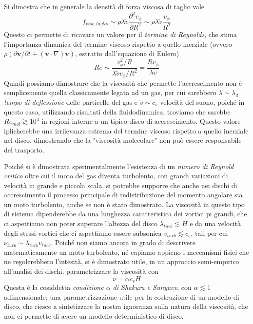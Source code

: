 \documentclass[a4paperbi]{article}
\begin{document}
	Si dimostra che in generale la densità di forza viscosa di taglio vale
	\begin{equation}
		f_{visc,taglio}\sim\rho\lambda\tilde{v}\frac{\partial^2v_\phi}{\partial R^2}\sim\rho\lambda\tilde{v}\frac{v_\phi}{R^2}
	\end{equation}
	Questo ci permette di ricavare un valore per il \textit{termine di Reynolds}, che stima l'importanza dinamica del termine viscoso rispetto a quello inerziale (ovvero $\rho(\partial\textbf{v}/\partial t+(\textbf{v}\cdot\nabla)\textbf{v})$, estratto dall'equazione di Eulero)
	\begin{equation}
		Re\sim\frac{v_\phi^2/R}{\lambda\tilde{v}v_\phi/R^2}=\frac{Rv_\phi}{\lambda\tilde{v}}
	\end{equation}
	Quindi possiamo dimostrare che la viscosità che permette l'accrescimento non è semplicemente quella classicamente legata ad un gas, per cui sarebbero $\lambda\sim\lambda_d$ \textit{tempo di deflessione} delle particelle del gas e $\tilde{v}\sim c_s$ velocità del suono, poiché in questo caso, utilizzando risultati della fluidodinamica, troviamo che sarebbe $Re_{mol}\gtrsim10^4$ in regioni interne a un tipico disco di accrescimento. Questo valore iplicherebbe una irrilevanza estrema del termine viscoso rispetto a quello inerziale nel disco, dimostrando che la "viscosità molecolare" non può essere responsabile del trasporto.
	
	Poiché si è dimostrata sperimentalmente l'esistenza di un \textit{numero di Reynold critico} oltre cui il moto del gas diventa turbolento, con grandi variazioni di velocità in grande e piccola scala, si potrebbe supporre che anche nei dischi di accrescimento il processo principale di redistribuzione del momento angolare sia un moto turbolento, anche se non è stato dimostrato.
	La viscosità in questo tipo di sistema dipenderebbe da una lunghezza caratteristica dei vortici pi grandi, che ci aspettiamo non poter superare l'altezza del disco $\lambda_{turb}\lesssim H$ e da una velocità degli stessi vortici che ci aspettiamo essere subsonica $v_{turb}\lesssim c_s$, tali per cui $\nu_{turb}\sim \lambda_{turb}v_{turb}$.
	Poiché non siamo ancora in grado di descrivere matematicamente un moto turbolento, né capiamo appieno i meccanismi fisici che ne regolerebbero l'intesità, si è dimostrato utile, in un approccio semi-empirico all'analisi dei dischi, parametrizzare la viscosità con
	\begin{equation}
		\nu=\alpha c_s H
	\end{equation}
	Questa è la cosiddetta \textit{condizione $\alpha$ di Shakura e Sunyaev}, con $\alpha\lesssim 1$ adimensionale: una parametrizzazione utile per la costruzione di un modello di disco, che riesce a sintetizzare la nostra ignoranza sulla natura della viscosità, che non ci permette di avere un modello deterministico di disco.
\end{document}
